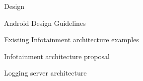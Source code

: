 
\chap Design

\sec Android Design Guidelines

\sec Existing Infotainment architecture examples

\sec Infotainment architecture proposal

\sec Logging server architecture

